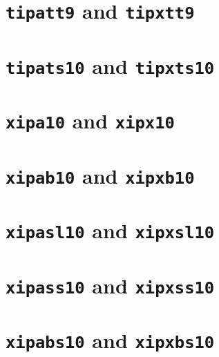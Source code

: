 \sampletext{\footnotesize\ttfamily\tipaencoding}

\section{\texttt{tipatt9} and \texttt{tipxtt9}}

\sampletext{\small\ttfamily\tipaencoding}

\section{\texttt{tipats10} and \texttt{tipxts10}}

\sampletext{\ttfamily\slshape\tipaencoding}

\section{\texttt{xipa10} and \texttt{xipx10}}

\sampletext{\rmxipa\rmfamily\tipaencoding}

\section{\texttt{xipab10} and \texttt{xipxb10}}

\sampletext{\rmxipa\rmfamily\bfseries\tipaencoding}

\section{\texttt{xipasl10} and \texttt{xipxsl10}}

\sampletext{\rmxipa\rmfamily\slshape\tipaencoding}

\section{\texttt{xipass10} and \texttt{xipxss10}}

\sampletext{\rmxipa\sffamily\tipaencoding}

\section{\texttt{xipabs10} and \texttt{xipxbs10}}

